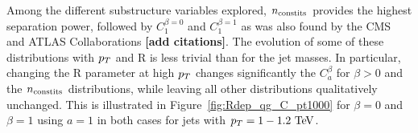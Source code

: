 Among the different substructure variables explored, $n_{\rm constits}$ provides the highest separation
power, followed by $C_1^{\beta=0}$ and $C_1^{\beta=1}$ as was also found by the CMS and ATLAS Collaborations 
{\bf [add citations]}. The evolution of some of these distributions with $p_T$ and R is less trivial than
 for the jet masses. In particular, changing the R parameter at high $p_T$ changes significantly the $C_a^{\beta}$
for $\beta>0$ and the $n_{\rm constits}$ distributions, while leaving all other distributions qualitatively unchanged. 
This is illustrated in Figure~\ref{fig:Rdep_qg_C_pt1000} for $\beta=0$ and $\beta=1$ using $a=1$ in both cases for
jets with $\pt=1-1.2\TeV$. 
\begin{figure}
\begin{center}
\\

\end{center}
\end{figure}
